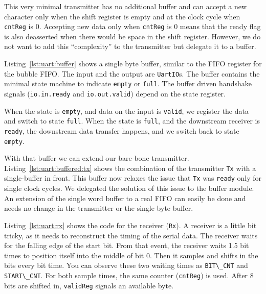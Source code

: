 \documentclass[%
    10pt,
    headinclude, footexclude,
    openright, %
    notitlepage,
    cleardoubleempty,
    headsepline,
    pointlessnumbers,
    bibtotoc, idxtotoc,
    ]{scrbook}
\newcommand{\code}[1]{{\lstinline[basicstyle=\small\ttfamily]{#1}}}
\begin{document}
This very minimal transmitter has no additional buffer and can
accept a new character only when the shift register is empty
and at the clock cycle when \code{cntReg} is 0.
Accepting new data only when \code{cntReg} is 0 means
that the ready flag is also deasserted when there would be
space in the shift register. However, we do not want to add this
``complexity'' to the transmitter but delegate it to a buffer.


Listing~\ref{lst:uart:buffer} shows a single byte buffer, similar to
the FIFO register for the bubble FIFO. The input and the output
are \code{UartIO}s.
The buffer contains the minimal state machine
to indicate \code{empty} or \code{full}. The buffer driven handshake
signals (\code{io.in.ready} and \code{io.out.valid}) depend on the state
register.

When the state is \code{empty}, and data on the input is \code{valid},
we register the data and switch to state \code{full}.
When the state is \code{full}, and the downstream receiver is
\code{ready}, the downstream data transfer happens, and we switch
back to state \code{empty}.


With that buffer we can extend our bare-bone transmitter.
Listing~\ref{lst:uart:buffered:tx} shows the combination of the transmitter \code{Tx}
with a single-buffer in front. This buffer now relaxes the issue that \code{Tx}
was \code{ready} only for single clock cycles. We delegated the solution of
this issue to the buffer module.
An extension of the single word buffer to a real FIFO can easily be done
and needs no change in the transmitter or the single byte buffer.


Listing~\ref{lst:uart:rx} shows the code for the receiver (\code{Rx}).
A receiver is a little bit tricky, as it needs to reconstruct the timing of
the serial data. The receiver waits for the falling edge of the start bit.
From that event, the receiver waits 1.5 bit times to position itself into the middle
of bit 0. Then it samples and shifts in the bits every bit time. You can observe these
two waiting times as \code{BIT\_CNT} and \code{START\_CNT}.
For both sample times, the same counter (\code{cntReg}) is used.
After 8 bits are shifted in, \code{validReg} signals an available byte.
\end{document}
